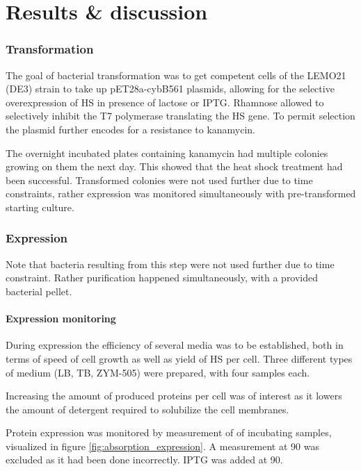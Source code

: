 \twocolumn

\part{Results \& discussion}

\section{Transformation}

The goal of bacterial transformation was to get competent \ecoli{} cells of the
LEMO21 (DE3) strain to take up pET28a-cybB561 plasmids, allowing for the
selective overexpression of HS in presence of lactose or IPTG. Rhamnose allowed
to selectively inhibit the T7 polymerase translating the HS gene.
\cite{memstar} To permit selection the plasmid further encodes for a resistance
to kanamycin.

The overnight incubated plates containing kanamycin had multiple colonies
growing on them the next day. This showed that the heat shock treatment had
been successful. Transformed colonies were not used further due to time
constraints, rather expression was monitored simultaneously with
pre-transformed starting culture.

\section{Expression}

Note that bacteria resulting from this step were not used further due to time
constraint. Rather purification happened simultaneously, with a provided
bacterial pellet.

\subsection{Expression monitoring}

During expression the efficiency of several media was to be established, both
in terms of speed of cell growth as well as yield of HS per cell. Three
different types of medium (LB, TB, ZYM-505) were prepared, with four samples
each.

Increasing the amount of produced proteins per cell was of interest as it
lowers the amount of detergent required to solubilize the cell membranes.

Protein expression was monitored by measurement of \odbact of incubating
samples, visualized in figure \ref{fig:absorption_expression}. A measurement at
\SI{90}{\min} was excluded as it had been done incorrectly. IPTG was added at
\SI{90}{\min}.

